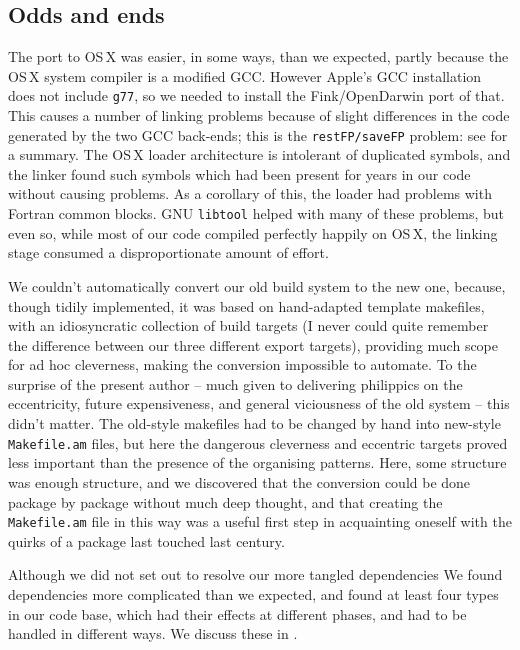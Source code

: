 \documentclass{speauth}
\begin{document}
\subsection{Odds and ends}

The port to OS\,X was easier, in some ways, than we expected, partly
because the OS\,X system compiler is a modified GCC.  However Apple's
GCC installation does not include \texttt{g77}, so we needed to
install the Fink/OpenDarwin port of that.  This causes a number of
linking problems because of slight differences in the code generated
by the two GCC back-ends; this is the \texttt{restFP/saveFP} problem:
see \cite{gray04} for a summary.  The OS\,X loader architecture is
intolerant of duplicated symbols, and the linker found such symbols
which had been present for years in our code without causing problems.
As a corollary of this, the loader had problems with Fortran common
blocks.  GNU \texttt{libtool} helped with many of these problems, but
even so, while most of our code compiled perfectly happily on OS\,X,
the linking stage consumed a disproportionate amount of effort.

We couldn't automatically convert our old build system to the new one,
because, though tidily implemented, it was based on hand-adapted
template makefiles, with an idiosyncratic collection of build targets
(I never could quite remember the difference between our three
different export targets), providing much scope for ad hoc
cleverness, making the conversion impossible to automate.  To the
surprise of the present author -- much given to 
delivering philippics on the eccentricity, future expensiveness, and
general viciousness of the old system -- this didn't matter.  The
old-style makefiles had to be changed by hand into new-style
\texttt{Makefile.am} files, but here the dangerous cleverness and
eccentric targets proved less important than the presence of the
organising patterns.  Here, some structure was enough structure, and
we discovered that the conversion could be done
package by package without much deep thought, and that creating the
\texttt{Makefile.am} file in this way was a useful first step in
acquainting oneself with the quirks of a package last touched last century.

Although we did not set out to resolve our more tangled dependencies
We found dependencies more complicated than we expected, and found at
least four types in our code base, which had their effects at
different phases, and had to be handled in different ways.  We discuss
these in .
\end{document}
